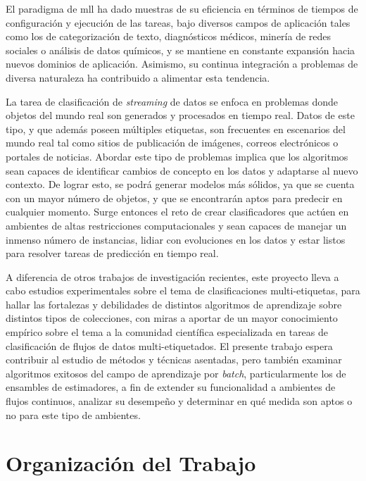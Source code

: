El paradigma de \acrshort{mll} ha dado muestras de su eficiencia en términos de
tiempos de configuración y ejecución de las tareas, bajo diversos campos de
aplicación tales como los de categorización de texto, diagnósticos médicos,
minería de redes sociales o análisis de datos químicos, y se mantiene en
constante expansión hacia nuevos dominios de aplicación. Asimismo, su continua
integración a problemas de diversa naturaleza ha contribuido a alimentar esta
tendencia.

La tarea de clasificación de \textit{streaming} de datos se enfoca en problemas
donde objetos del mundo real son generados y procesados en tiempo real. Datos de
este tipo, y que además poseen múltiples etiquetas, son frecuentes en escenarios
del mundo real tal como sitios de publicación de imágenes, correos electrónicos
o portales de noticias. Abordar este tipo de problemas implica que los
algoritmos sean capaces de identificar cambios de concepto en los datos y
adaptarse al nuevo contexto. De lograr esto, se podrá generar modelos más
sólidos, ya que se cuenta con un mayor número de objetos, y que se encontrarán
aptos para predecir en cualquier momento. Surge entonces el reto de crear
clasificadores que actúen en ambientes de altas restricciones computacionales y
sean capaces de manejar un inmenso número de instancias, lidiar con evoluciones
en los datos y estar listos para resolver tareas de predicción en tiempo real.

A diferencia de otros trabajos de investigación recientes, este proyecto lleva a
cabo estudios experimentales sobre el tema de clasificaciones multi-etiquetas,
para hallar las fortalezas y debilidades de distintos algoritmos de aprendizaje
sobre distintos tipos de colecciones, con miras a aportar de un mayor
conocimiento empírico sobre el tema a la comunidad científica especializada en
tareas de clasificación de flujos de datos multi-etiquetados. El presente
trabajo espera contribuir al estudio de métodos y técnicas asentadas, pero
también examinar algoritmos exitosos del campo de aprendizaje por
\textit{batch}, particularmente los de ensambles de estimadores, a fin de
extender su funcionalidad a ambientes de flujos continuos, analizar su desempeño
y determinar en qué medida son aptos o no para este tipo de ambientes.


\section{Organización del Trabajo}

